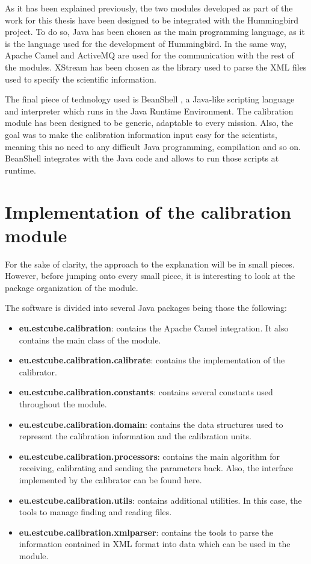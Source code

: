 As it has been explained previously, the two modules developed as part of the work for this thesis have been designed to be integrated with the Hummingbird project. To do so, Java \cite{Java} has been chosen as the main programming language, as it is the language used for the development of Hummingbird. In the same way, Apache Camel \cite{Camel} and ActiveMQ \cite{AMQ} are used for the communication with the rest of the modules. XStream \cite{XStream} has been chosen as the library used to parse the XML \cite{XML} files used to specify the scientific information.

The final piece of technology used is BeanShell \citep{BSH}, a Java-like scripting language and interpreter which runs in the Java Runtime Environment. The calibration module has been designed to be generic, adaptable to every mission. Also, the goal was to make the calibration information input easy for the scientists, meaning this no need to any difficult Java programming, compilation and so on. BeanShell integrates with the Java code and allows to run those scripts at runtime.
\pagebreak
\section{Implementation of the calibration module}

For the sake of clarity, the approach to the explanation will be in small pieces. However, before jumping onto every small piece, it is interesting to look at the package organization of the module.

The software is divided into several Java packages being those the following:
\begin{itemize}
\item \textbf{eu.estcube.calibration}: contains the Apache Camel integration. It also contains the main class of the module.
\item \textbf{eu.estcube.calibration.calibrate}: contains the implementation of the calibrator.
\item \textbf{eu.estcube.calibration.constants}: contains several constants used throughout the module.
\item \textbf{eu.estcube.calibration.domain}: contains the data structures used to represent the calibration information and the calibration units.
\item \textbf{eu.estcube.calibration.processors}: contains the main algorithm for receiving, calibrating and sending the parameters back. Also, the interface implemented by the calibrator can be found here.
\item \textbf{eu.estcube.calibration.utils}: contains additional utilities. In this case, the tools to manage finding and reading files.
\item \textbf{eu.estcube.calibration.xmlparser}: contains the tools to parse the information contained in XML format into data which can be used in the module.
\end{itemize}

